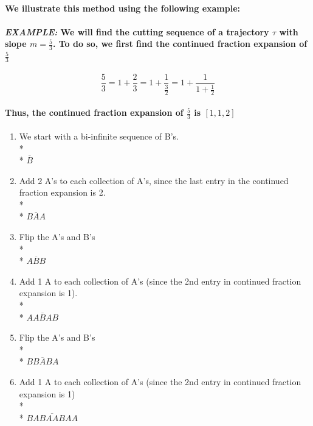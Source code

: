 \documentclass{report}
\begin{document}
\paragraph{We illustrate this method using the following example:}


\paragraph{\textit{EXAMPLE:} We will find the cutting sequence of a trajectory $\tau$ with slope $m=\frac{5}{3}$. To do so, we first find the continued fraction expansion of $\frac{5}{3}$ }

\begin{equation}
\frac{5}{3}=1+\frac{2}{3}=1+\frac{1}{\frac{3}{2}}=1+\frac{1}{1+\frac{1}{2}}
\end{equation}

\paragraph{Thus, the continued fraction expansion of $\frac{5}{3}$ is $[1,1,2]$}

\begin{enumerate}
\item  {We start with a bi-infinite sequence of B’s.
\\* \\* $\overline{B}$}

\item  {Add 2 A’s to each collection of A’s, since the last entry in the continued fraction expansion is 2.
\\* \\* $\overline{BAA}$}

\item  {Flip the A’s and B’s
\\* \\* $\overline{ABB}$}

\item  {Add 1 A to each collection of A’s (since the 2nd entry in continued fraction expansion is 1).
\\* \\* $\overline{AABAB}$}

\item  {Flip the A’s and B’s
\\* \\* $\overline{BBABA}$}

\item  {Add 1 A to each collection of A’s (since the 2nd entry in continued fraction expansion is 1)
\\* \\* $\overline{BABAABAA}$}
\end{enumerate}
\end{document}

